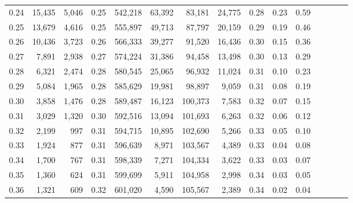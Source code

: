 \begin{tabular}{rrrcrrrrrrrrrrr}
0.24 &  15,435 &  5,046 &                                       0.25 &  542,218 &   63,392 &   83,181 &   24,775 &  0.28 &  0.23 &                         0.59 \\
0.25 &  13,679 &  4,616 &                                       0.25 &  555,897 &   49,713 &   87,797 &   20,159 &  0.29 &  0.19 &                         0.46 \\
0.26 &  10,436 &  3,723 &                                       0.26 &  566,333 &   39,277 &   91,520 &   16,436 &  0.30 &  0.15 &                         0.36 \\
0.27 &   7,891 &  2,938 &                                       0.27 &  574,224 &   31,386 &   94,458 &   13,498 &  0.30 &  0.13 &                         0.29 \\
0.28 &   6,321 &  2,474 &                                       0.28 &  580,545 &   25,065 &   96,932 &   11,024 &  0.31 &  0.10 &                         0.23 \\
0.29 &   5,084 &  1,965 &                                       0.28 &  585,629 &   19,981 &   98,897 &    9,059 &  0.31 &  0.08 &                         0.19 \\
0.30 &   3,858 &  1,476 &                                       0.28 &  589,487 &   16,123 &  100,373 &    7,583 &  0.32 &  0.07 &                         0.15 \\
0.31 &   3,029 &  1,320 &                                       0.30 &  592,516 &   13,094 &  101,693 &    6,263 &  0.32 &  0.06 &                         0.12 \\
0.32 &   2,199 &    997 &                                       0.31 &  594,715 &   10,895 &  102,690 &    5,266 &  0.33 &  0.05 &                         0.10 \\
0.33 &   1,924 &    877 &                                       0.31 &  596,639 &    8,971 &  103,567 &    4,389 &  0.33 &  0.04 &                         0.08 \\
0.34 &   1,700 &    767 &                                       0.31 &  598,339 &    7,271 &  104,334 &    3,622 &  0.33 &  0.03 &                         0.07 \\
0.35 &   1,360 &    624 &                                       0.31 &  599,699 &    5,911 &  104,958 &    2,998 &  0.34 &  0.03 &                         0.05 \\
0.36 &   1,321 &    609 &                                       0.32 &  601,020 &    4,590 &  105,567 &    2,389 &  0.34 &  0.02 &                         0.04 \\

\end{tabular}

